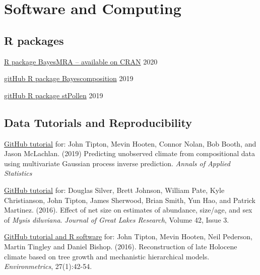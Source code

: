 \documentclass[11pt,]{article}
\providecommand{\tightlist}{%
  \setlength{\itemsep}{0pt}\setlength{\parskip}{0pt}}
\renewenvironment{itemize}{
  \begin{list}{}{
    \setlength{\leftmargin}{1.5em}
  }
}{
  \end{list}
}
\begin{document}
\hypertarget{software-and-computing}{%
\section{Software and Computing}\label{software-and-computing}}

\hypertarget{r-packages}{%
\subsection{R packages}\label{r-packages}}

\begin{itemize}
\tightlist
\item
  \href{https://github.com/jtipton25/BayesMRA}{R package BayesMRA --
  available on CRAN} \hfill 2020
\item
  \href{https://github.com/jtipton25/BayesComposition}{gitHub R package
  Bayescomposition} \hfill 2019
\item
  \href{https://github.com/jtipton25/stPollen}{gitHub R package
  stPollen} \hfill 2019
\end{itemize}

\hypertarget{data-tutorials-and-reproducibility}{%
\subsection{Data Tutorials and
Reproducibility}\label{data-tutorials-and-reproducibility}}

\begin{itemize}
\item
  \href{https://github.com/jtipton25/compositional-inverse-prediction/}{GitHub
  tutorial} for: John Tipton, Mevin Hooten, Connor Nolan, Bob Booth, and
  Jason McLachlan. (2019) Predicting unobserved climate from
  compositional data using multivariate Gaussian process inverse
  prediction. \textit{Annals of Applied Statistics}
\item
  \href{https://jtipton25.github.io/mysis/}{GitHub tutorial} for:
  Douglas Silver, Brett Johnson, William Pate, Kyle Christianson, John
  Tipton, James Sherwood, Brian Smith, Yun Hao, and Patrick Martinez.
  (2016). Effect of net size on estimates of abundance, size/age, and
  sex of \textit{Mysis diluviana}.
  \textit{Journal of Great Lakes Research}, Volume 42, Issue 3.
\item
  \href{https://github.com/jtipton25/Mechanistic-Tree-Ring}{GitHub
  tutorial and R software} for: John Tipton, Mevin Hooten, Neil
  Pederson, Martin Tingley and Daniel Bishop. (2016). Reconstruction of
  late Holocene climate based on tree growth and mechanistic
  hierarchical models. \textit{Environmetrics}, 27(1):42-54.
\end{itemize}
\end{document}
